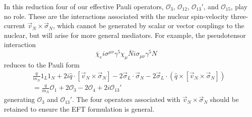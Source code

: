 \documentclass{book}[12pt]
\begin{document}
In this reduction four of our effective Pauli operators, $\mathcal{O}_3$, $\mathcal{O}_{12}$, $\mathcal{O}_{13}'$, and $\mathcal{O}_{15}$, play no role. These are the interactions associated with the nuclear spin-velocity three-current $\vec{v}_N\times\vec{\sigma}_N$, which cannot be generated by scalar or vector couplings to the nuclear, but will arise for more general mediators. For example, the pseudotensor interaction
\begin{equation}
\bar{\chi}_ei\sigma^{\mu\nu}\gamma^5\chi_{\mu}\bar{N}i\sigma_{\mu\nu}\gamma^5N
\end{equation}
reduces to the Pauli form
\begin{equation}
\begin{split}
&\frac{q}{m_N}1_L1_N+2i\hat{q}\cdot\left[\vec{v}_N\times\vec{\sigma}_N\right]-2\vec{\sigma}_L\cdot\vec{\sigma}_N-2\vec{\sigma}_L\cdot\left(\hat{q}\times\left[\vec{v}_N\times\vec{\sigma}_N\right]\right)\\
&=\frac{q}{m_N}\mathcal{O}_1+2\mathcal{O}_3-2\mathcal{O}_4+2i\mathcal{O}_{13}'
\end{split}
\end{equation}
generating $\mathcal{O}_3$ and $\mathcal{O}_{13}'$. The four operators associated with $\vec{v}_N\times\vec{\sigma}_N$ should be retained to ensure the EFT formulation is general.
\end{document}
